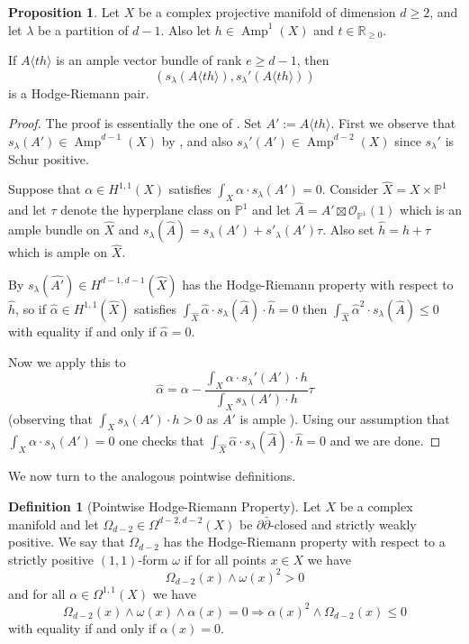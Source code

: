 \documentclass[a4,reqno]{amsart}
\theoremstyle{definition}
\newtheorem{proposition}[theorem]{Proposition}
\newtheorem{definition}[theorem]{Definition}
\DeclareMathOperator{\Amp}{Amp}
\numberwithin{equation}{section}
\begin{document}
\begin{proposition}\label{prop:ShurAmpleHRpair}
Let $X$ be a complex projective manifold of dimension $d\ge 2$, and let $\lambda$ be a partition of $d-1$. Also let $h\in \Amp^1(X)$ and $t\in \mathbb R_{\ge 0}$.  

If $A\langle th\rangle$ is an ample vector bundle of rank $e \ge d-1$, then 
$$(s_\lambda(A\langle th\rangle),s_\lambda'(A\langle th\rangle))$$ is a Hodge-Riemann pair.
\end{proposition}
\begin{proof}
The proof is essentially the one of \cite[Theorem 10.2]{RossToma2}.  Set $A':= A\langle th\rangle$. First we observe that $s_{\lambda}(A')\in \Amp^{d-1}(X)$ by \cite{FL}, and also $s_{\lambda}'(A')\in \Amp^{d-2}(X)$ since $s_{\lambda}'$ is Schur positive. 

Suppose that $\alpha\in H^{1,1}(X)$ satisfies $\int_X \alpha \cdot s_{\lambda}(A')=0$.     Consider $\hat{X} = X\times \mathbb P^1$ and let $\tau$ denote the hyperplane class on $\mathbb P^1$ and let $\hat{A} = A'\boxtimes \mathcal O_{\mathbb P^1}(1)$ which is an ample bundle on $\hat{X}$ and $s_{\lambda}(\hat{A}) = s_\lambda(A') + s'_\lambda(A')\tau$.   Also set $\hat{h} = h + \tau$ which is ample on $\hat{X}$.

By \cite[Theorem 5.3]{RossToma1} $s_{\lambda}(\hat{A'}) \in H^{d-1,d-1}(\hat{X})$ has the Hodge-Riemann property with respect to $\hat{h}$, so if $\hat{\alpha} \in H^{1,1}(\hat{X})$ satisfies $\int_{\hat{X}} \hat{\alpha} \cdot s_\lambda(\hat{A})\cdot \hat{h}=0$ then $\int_{\hat{X}} \hat{\alpha}^2\cdot s_{\lambda}(\hat{A})\le 0$ with equality if and only if $\hat{\alpha}=0$.

Now we apply this to
$$\hat{\alpha} = \alpha - \frac{\int_X \alpha \cdot s_\lambda'(A')\cdot h}{\int_X s_\lambda(A')\cdot h} \tau$$
(observing that $\int_X s_\lambda(A')\cdot h>0$ as $A'$ is ample \cite{FultonLazarsfeld}).  Using our assumption that $\int_X \alpha \cdot s_{\lambda}(A')=0$ one checks that $\int_{\hat{X}} \hat{\alpha}\cdot  s_{\lambda}(\hat{A})\cdot\hat{h}=0$ and we are done.
\end{proof}




We now turn to the analogous pointwise definitions.

\begin{definition}[Pointwise Hodge-Riemann Property]\label{def:analyticHR}
Let $X$ be a complex manifold  and let $\Omega_{d-2}\in \Omega^{d-2,d-2}(X)$ be $\partial \bar{\partial}$-closed and strictly weakly positive. We say that
$\Omega_{d-2}$ has the Hodge-Riemann property with respect to a strictly  positive $(1,1)$-form $\omega$ if for all points $x\in X$ we have
$$\Omega_{d-2}(x) \wedge \omega(x)^2>0$$
and for all $\alpha \in \Omega^{1,1}(X)$ we have
$$\Omega_{d-2}(x) \wedge \omega(x) \wedge \alpha(x)=0 \Rightarrow \alpha(x)^2 \wedge \Omega_{d-2}(x)\le 0$$
with equality if and only if $\alpha(x)=0$.
\end{definition}
\end{document}

